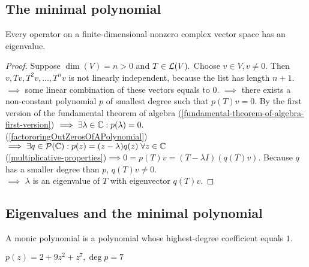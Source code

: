 \subsection{The minimal polynomial}

\begin{thm}
    Every operator on a finite-dimensional nonzero complex vector space has an eigenvalue.
\end{thm}
\begin{proof}
    Suppose $\dim(V)=n>0$ and $T\in \mathcal{L}(V).$ Choose $v\in V, v\neq0$. Then $v, Tv, T^2v, \dots, T^nv$ is not linearly independent, because the list has length $n+1$. $\implies$ some linear combination of these vectors equals to $0$. $\implies$ there exists a non-constant polynomial $p$ of smallest degree such that $p(T)v = 0$. By the first version of the fundamental theorem of algebra (\ref{fundamental-theorem-of-algebra-first-version}) $\implies \exists \lambda \in \mathbb{C}: p(\lambda) = 0.$\\
    (\ref{factororingOutZerosOfAPolynomial})$\implies \exists q \in \mathcal {P} (\mathbb{C}): p(z) = (z-\lambda)  q(z) \; \forall z \in \mathbb{C}$ \\
    (\ref{multiplicative-properties})$\implies 0=p(T)v=(T-\lambda I) (q(T)v)$. Because $q$ has a smaller degree than $p$, $q(T)v \neq 0$. \\
    $\implies$ $\lambda$ is an eigenvalue of $T$ with eigenvector $q(T)v$. 
\end{proof}

\subsection{Eigenvalues and the minimal polynomial}
\begin{mydef}
    A monic polynomial is a polynomial whose highest-degree coefficient equals $1$. 
\end{mydef}
\begin{example}
    $p(z)=2+9z^2+z^7, \deg p = 7$
\end{example}

